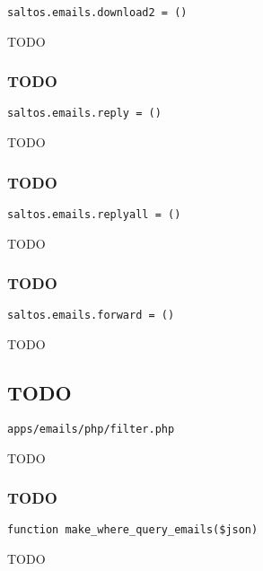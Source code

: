 \documentclass[a4paper]{article}
\begin{document}
\begin{lstlisting}
saltos.emails.download2 = ()
\end{lstlisting}

TODO

\hypertarget{toc63}{}
\subsubsection{TODO}

\begin{lstlisting}
saltos.emails.reply = ()
\end{lstlisting}

TODO

\hypertarget{toc64}{}
\subsubsection{TODO}

\begin{lstlisting}
saltos.emails.replyall = ()
\end{lstlisting}

TODO

\hypertarget{toc65}{}
\subsubsection{TODO}

\begin{lstlisting}
saltos.emails.forward = ()
\end{lstlisting}

TODO

\hypertarget{toc66}{}
\subsection{TODO}

\begin{lstlisting}
apps/emails/php/filter.php
\end{lstlisting}

TODO

\hypertarget{toc67}{}
\subsubsection{TODO}

\begin{lstlisting}
function make_where_query_emails($json)
\end{lstlisting}

TODO
\end{document}
